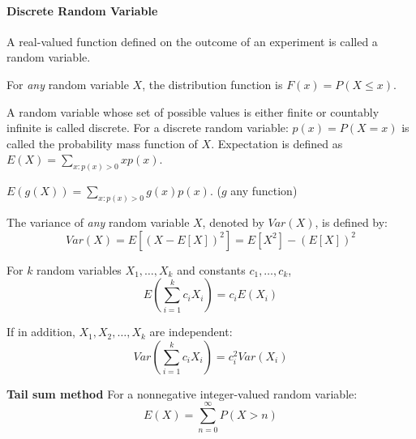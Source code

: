 \documentclass[10pt,twocolumn]{article}
\numberwithin{equation}{section}
\begin{document}
\paragraph{Discrete Random Variable}
\ben
\item A real-valued function defined on the outcome of an experiment is called a random variable. 
\item For \textit{any} random variable $X$, the distribution function is $F(x) = P(X \le x)$. 
\item A random variable whose set of possible values is either finite or countably infinite
is called discrete. For a discrete random variable: $p(x) = P(X = x)$ is called the probability mass function of $X$. Expectation is defined as $E(X) = \sum_{x: p(x) > 0} x p(x)$. 
\item $E(g(X)) = \sum_{x: p(x) > 0} g(x)p(x)$. ($g$ any function)
\item The variance of \textit{any} random variable $X$, denoted by $Var(X)$, is defined by: 
\[
Var(X) = E[(X - E[X])^2] = E[X^2] - (E[X])^2 
\]
\item For $k$ random variables $X_1, \ldots, X_k$ and constants $c_1, \ldots, c_k$,
\[
E(\sum_{i=1}^{k} c_i X_i) = c_i E(X_i)
\]
\item If in addition, $X_1, X_2, \ldots, X_k$ are independent: 
\[
Var(\sum_{i=1}^{k} c_i X_i) = c_i^2 Var(X_i)
\]
\item \textbf{Tail sum method} For a nonnegative integer-valued random variable: 
\[
E(X) = \sum_{n=0}^{\infty} P(X >n)
\]
\een
\end{document}

